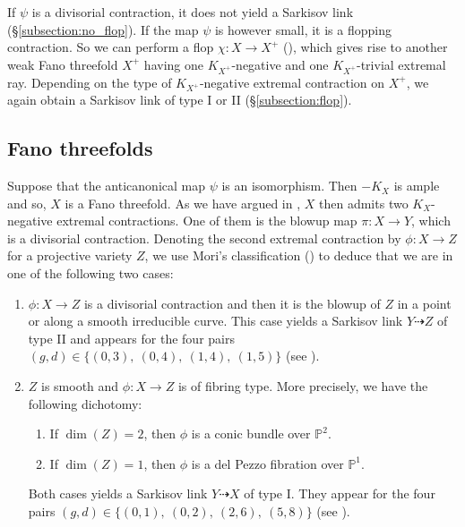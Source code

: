 \documentclass[english,11pt,reqno]{amsart}
\newcommand{\Pone}{\mathbb{P}^1}
\newcommand{\Ptwo}{\mathbb{P}^2}
\begin{document}
If $\psi$ is a divisorial contraction, it does not yield a Sarkisov link (\S\ref{subsection:no_flop}). If the map $\psi$ is however small, it is a flopping contraction. So we can perform a flop $\chi:X\rightarrow X^+$ (\cite[Thm\ 1.4.15 + Lemma 4.1.1]{Shafarevich_Parshin_AlgGeom_Fano_varieties}), which gives rise to another weak Fano threefold $X^+$ having one $K_{X^+}$-negative and one $K_{X^+}$-trivial extremal ray. Depending on the type of $K_{X^+}$-negative extremal contraction on $X^+$, we again obtain a Sarkisov link of type I or II (\S\ref{subsection:flop}).
%
%
\subsection{Fano threefolds} \label{subsection:Fano_threefolds}
%
Suppose that the anticanonical map $\psi$ is an isomorphism. Then $-K_X$ is ample and so, $X$ is a Fano threefold. As we have argued in , $X$ then admits two $K_X$-negative extremal contractions. One of them is the blowup map $\pi:X\rightarrow Y$, which is a divisorial contraction. Denoting the second extremal contraction by $\phi: X\rightarrow Z$ for a projective variety $Z$, we use Mori's classification (\cite[Thm.\ 3.3-3.5]{Mori-Extremal_contractions_threefolds}) to deduce that we are in one of the following two cases:
\begin{enumerate}
\item[(1)] $\phi:X\rightarrow Z$ is a divisorial contraction and then it is the blowup of $Z$ in a point or along a smooth irreducible curve. This case yields a Sarkisov link $Y \dashrightarrow Z$ of type II and appears for the four pairs $(g,d)\in \{(0,3), \: (0,4),\:(1,4),\: (1,5)\}$ (see ). 
\item[(2)] $Z$ is smooth and $\phi:X\rightarrow Z$ is of fibring type. More precisely, we have the following dichotomy:
\begin{enumerate}
\item If $\dim(Z)=2$, then $\phi$ is a conic bundle over $\Ptwo$.
\item If $\dim(Z)=1$, then $\phi$ is a del Pezzo fibration over $\Pone$.
\end{enumerate}
Both cases yields a Sarkisov link $Y\dashrightarrow X$ of type I. They appear for the four pairs $(g,d)\in \{(0,1),\:(0,2),\:(2,6),\:(5,8)\}$ (see ).
\end{enumerate}
%
\end{document}
